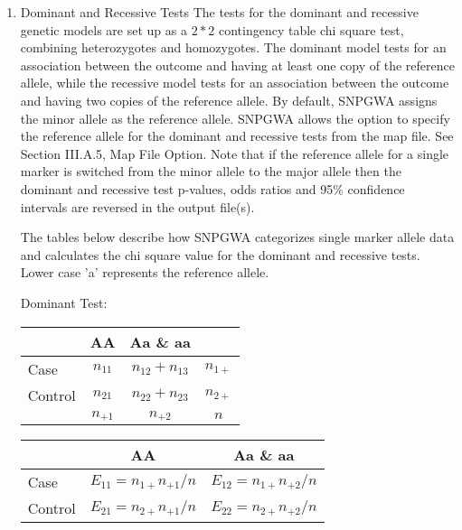 \begin{enumerate}
\item{Dominant and Recessive Tests}
The tests for the dominant and recessive genetic models are set up as a $2 * 2$
contingency table chi square test, combining heterozygotes and homozygotes.  The
dominant model tests for an association between the outcome and having at least
one copy of the reference allele, while the recessive model tests for an
association between the outcome and having two copies of the reference allele.
By default, SNPGWA assigns the minor allele as the reference allele.  SNPGWA
allows the option to specify the reference allele for the dominant and recessive
tests from the map file.  See Section III.A.5, Map File Option.  Note that if
the reference allele for a single marker is switched from the minor allele to
the major allele then the dominant and recessive test p-values, odds ratios and
95\% confidence intervals are reversed in the output file(s).

The tables below describe how SNPGWA categorizes single marker allele data and
calculates the chi square value for the dominant and recessive tests.  Lower
case 'a' represents the reference allele.

\vspace{2em}
Dominant Test:

\begin{center}
  \begin{tabular}{lccc}
    \hline
    {}  & \textbf{AA}  & \textbf{Aa \& aa} & {} \\
    \hline
    Case    & $n_{11}$ & $n_{12} + n_{13}$ & $n_{1+}$ \\
    Control & $n_{21}$ & $n_{22} + n_{23}$ & $n_{2+}$ \\
    {}    & $n_{+1}$ & $n_{+2}$         & $n$ \\
    \hline  
  \end{tabular}
\end{center}

\begin{center}
  \begin{tabular}{lcc}
    \hline
    {}     & \textbf{AA}            & \textbf{Aa \& aa} \\
    \hline
    Case    & $E_{11} = n_{1+}n_{+1}/n$ &  $E_{12} = n_{1+}n_{+2}/n$ \\
    Control & $E_{21} = n_{2+}n_{+1}/n$ &  $E_{22} = n_{2+}n_{+2}/n$ \\
    \hline
  \end{tabular}
\end{center}


\end{enumerate}
